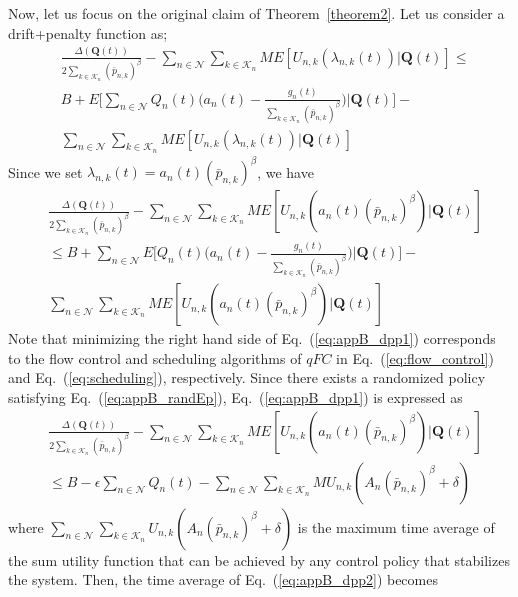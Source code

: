 \documentclass[conference]{IEEEtran}
\newcommand{\Kset}{\mathcal{K}}
\newcommand{\Nset}{\mathcal{N}}
\begin{document}
Now, let us focus on the original claim of Theorem~\ref{theorem2}. Let us consider a drift+penalty function as; 
\begin{align}
& \frac{\Delta(\boldsymbol Q(t))}{2\sum_{k \in \Kset_{n}} (\bar{p}_{n,k})^{\beta} } - \sum_{n \in \Nset} \sum_{k \in \Kset_{n}} M E[U_{n,k} (\lambda_{n,k}(t)) | \boldsymbol Q(t) ] 
\leq \nonumber \\
& B + E \bigl[ \sum_{n \in \Nset} Q_{n}(t) \bigl(a_{n}(t) -  \frac{g_{n}(t)}{\sum_{k \in \Kset_{n}} (\bar{p}_{n,k})^{\beta} } \bigr) | \boldsymbol Q(t)\bigr] - \nonumber \\
& \sum_{n \in \Nset} \sum_{k \in \Kset_{n}} M E[U_{n,k} (\lambda_{n,k}(t)) | \boldsymbol Q(t) ] 
\end{align} Since we set $\lambda_{n,k}(t) = a_{n}(t) (\bar{p}_{n,k})^{\beta}$, we have
\begin{align} \label{eq:appB_dpp1}
& \frac{\Delta(\boldsymbol Q(t))}{2\sum_{k \in \Kset_{n}} (\bar{p}_{n,k})^{\beta} } - \sum_{n \in \Nset} \sum_{k \in \Kset_{n}} M E[U_{n,k} (a_{n}(t) (\bar{p}_{n,k})^{\beta}) | \boldsymbol Q(t) ] 
\nonumber \\
& \leq  B + \sum_{n \in \Nset} E \bigl[  Q_{n}(t) \bigl(a_{n}(t) -  \frac{g_{n}(t)}{\sum_{k \in \Kset_{n}} (\bar{p}_{n,k})^{\beta} } \bigr) | \boldsymbol Q(t)\bigr] - \nonumber \\
& \sum_{n \in \Nset} \sum_{k \in \Kset_{n}} M E[U_{n,k} (a_{n}(t) (\bar{p}_{n,k})^{\beta}) | \boldsymbol Q(t) ] 
\end{align} Note that minimizing the right hand side of Eq.~(\ref{eq:appB_dpp1}) corresponds to the flow control and scheduling algorithms of $qFC$ in Eq.~(\ref{eq:flow_control}) and Eq.~(\ref{eq:scheduling}), respectively. Since there exists a randomized policy satisfying Eq.~(\ref{eq:appB_randEp}), Eq.~(\ref{eq:appB_dpp1}) is expressed as
\begin{align} \label{eq:appB_dpp2}
& \frac{\Delta(\boldsymbol Q(t))}{2\sum_{k \in \Kset_{n}} (\bar{p}_{n,k})^{\beta} } - \sum_{n \in \Nset} \sum_{k \in \Kset_{n}} M E[U_{n,k} (a_{n}(t) (\bar{p}_{n,k})^{\beta}) | \boldsymbol Q(t) ] 
\nonumber \\
& \leq  B - \epsilon \sum_{n \in \Nset} Q_{n}(t) - \sum_{n \in \Nset } \sum_{k \in \Kset_{n}} M U_{n,k}(A_n(\bar{p}_{n,k})^{\beta} + \delta) 
\end{align} where $\sum_{n \in \Nset} \sum_{k \in \Kset_{n}} U_{n,k}(A_n(\bar{p}_{n,k})^{\beta} + \delta)$ is the maximum time average of the sum utility function that can be achieved by any control policy that stabilizes the system. Then, the time average of Eq.~(\ref{eq:appB_dpp2}) becomes 
\end{document}
